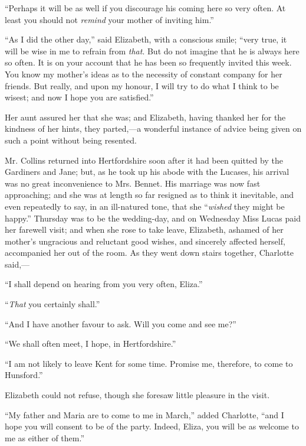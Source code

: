 \documentclass[12pt]{book}
\begin{document}
``Perhaps it will be as well if you discourage his coming here so very often. At least you should not \textit{remind} your mother of inviting him.''

``As I did the other day,'' said Elizabeth, with a conscious smile; ``very true, it will be wise in me to refrain from \textit{that}. But do not imagine that he is always here so often. It is on your account that he has been so frequently invited this week. You know my mother's ideas as to the necessity of constant company for her friends. But really, and upon my honour, I will try to do what I think to be wisest; and now I hope you are satisfied.''

Her aunt assured her that she was; and Elizabeth, having thanked her for the kindness of her hints, they parted,---a wonderful instance of advice being given on such a point without being resented.

Mr. Collins returned into Hertfordshire soon after it had been quitted by the Gardiners and Jane; but, as he took up his abode with the Lucases, his arrival was no great inconvenience to Mrs. Bennet. His marriage was now fast approaching; and she was at length so far resigned as to think it inevitable, and even repeatedly to say, in an ill-natured tone, that she ``\textit{wished} they might be happy.'' Thursday was to be the wedding-day, and on Wednesday Miss Lucas paid her farewell visit; and when she rose to take leave, Elizabeth, ashamed of her mother's ungracious and reluctant good wishes, and sincerely affected herself, accompanied her out of the room. As they went down stairs together, Charlotte said,---

``I shall depend on hearing from you very often, Eliza.''

``\textit{That} you certainly shall.''

``And I have another favour to ask. Will you come and see me?''

``We shall often meet, I hope, in Hertfordshire.''

``I am not likely to leave Kent for some time. Promise me, therefore, to come to Hunsford.''

Elizabeth could not refuse, though she foresaw little pleasure in the visit.

``My father and Maria are to come to me in March,'' added Charlotte, ``and I hope you will consent to be of the party. Indeed, Eliza, you will be as welcome to me as either of them.''
\end{document}
